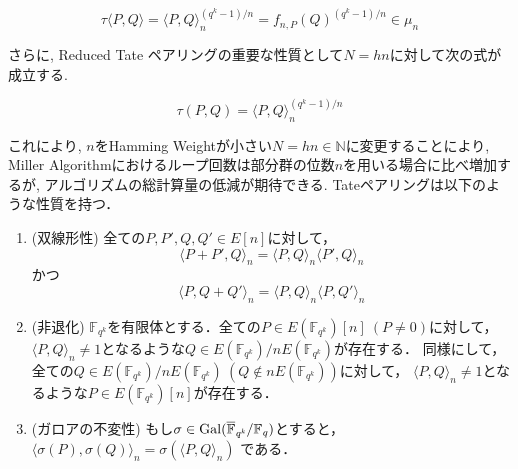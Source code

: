 \[
\tau \langle P,Q \rangle = \langle P,Q \rangle _n^{(q^k - 1) / n} = f_{n,P}(Q)^{(q^k - 1) / n} \in \mu_n
\]
\par
さらに, Reduced Tate ペアリングの重要な性質として$N = hn$に対して次の式が成立する.
\par
\[
\tau(P,Q) = \langle P,Q \rangle _n^{(q^k - 1) / n}
\]
\par
これにより, $n$をHamming Weightが小さい$N = hn \in \mathbb{N}$に変更することにより, Miller Algorithmにおけるループ回数は部分群の位数$n$を用いる場合に比べ増加するが, アルゴリズムの総計算量の低減が期待できる.
Tateペアリングは以下のような性質を持つ．
\begin{enumerate}
  \item (双線形性) 全ての$P, P', Q, Q' \in E[n]$に対して，
  \[
  \langle P + P', Q \rangle _n = \langle P, Q \rangle _n \langle P', Q \rangle _n
  \]
  かつ
  \[
  \langle P, Q + Q' \rangle _n = \langle P, Q \rangle _n \langle P, Q' \rangle _n
  \]
  \item (非退化) $\mathbb{F}_{q^k}$を有限体とする．全ての$P \in E(\mathbb{F}_{q^k})[n] \ (P \not= 0)$に対して，
  $\langle P, Q\rangle _n \not= 1$となるような$Q \in E(\mathbb{F}_{q^k}) / nE(\mathbb{F}_{q^k})$が存在する．
  同様にして，全ての$Q \in E(\mathbb{F}_{q^k}) / nE(\mathbb{F}_{q^k}) \ (Q \notin nE(\mathbb{F}_{q^k}))$に対して，
  $\langle P, Q\rangle _n \not= 1$となるような$P \in E(\mathbb{F}_{q^k})[n]$が存在する．
  \item (ガロアの不変性) もし$\sigma \in \rm{Gal}\it{(\overline{\mathbb{F}}_{q^k} / \mathbb{F}_q)}$とすると，
  $\langle \sigma (P), \sigma (Q) \rangle _n = \sigma(\langle P, Q \rangle _n)$
  である．
\end{enumerate}

\par
